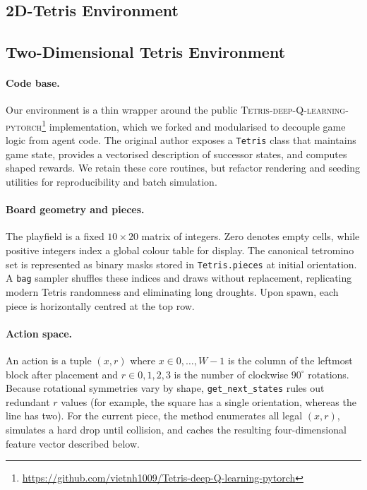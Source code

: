 \subsection{2D-Tetris Environment}
\subsection{Two-Dimensional Tetris Environment}

\paragraph{Code base.}
Our environment is a thin wrapper around the public \textsc{Tetris-deep-Q-learning-pytorch}\footnote{\url{https://github.com/vietnh1009/Tetris-deep-Q-learning-pytorch}} implementation, which we forked and modularised to decouple game logic from agent code.  The original author exposes a \texttt{Tetris} class that maintains game state, provides a vectorised description of successor states, and computes shaped rewards.  We retain these core routines, but refactor rendering and seeding utilities for reproducibility and batch simulation.

\paragraph{Board geometry and pieces.}
The playfield is a fixed $10 \times 20$ matrix of integers.  Zero denotes empty cells, while positive integers index a global colour table for display.  The canonical tetromino set is represented as binary masks stored in \texttt{Tetris.pieces} at initial orientation.  A \texttt{bag} sampler shuffles these indices and draws without replacement, replicating modern Tetris randomness and eliminating long droughts.  Upon spawn, each piece is horizontally centred at the top row.

\paragraph{Action space.}
An action is a tuple $(x,r)$ where $x\in{0,\dots,W-1}$ is the column of the leftmost block after placement and $r\in{0,1,2,3}$ is the number of clockwise $90^{\circ}$ rotations.  Because rotational symmetries vary by shape, \texttt{get\_next\_states} rules out redundant $r$ values (for example, the square has a single orientation, whereas the line has two).  For the current piece, the method enumerates all legal $(x,r)$, simulates a hard drop until collision, and caches the resulting four-dimensional feature vector described below.

